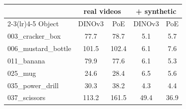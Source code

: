 \begin{tabular}{@{}l cc cc@{}}
\toprule
 & \multicolumn{2}{c}{real videos} & \multicolumn{2}{c}{+ synthetic} \\
\cmidrule(lr){2-3}\cmidrule(lr){4-5} Object & DINOv3 & PoE & DINOv3 & PoE \\
\midrule
003\_cracker\_box & 77.7 & 78.7 & 5.1 & 5.7 \\
006\_mustard\_bottle & 101.5 & 102.4 & 6.1 & 7.6 \\
011\_banana & 79.9 & 77.6 & 6.1 & 5.3 \\
025\_mug & 24.6 & 28.4 & 6.5 & 5.6 \\
035\_power\_drill & 30.3 & 38.2 & 4.3 & 4.4 \\
037\_scissors & 113.2 & 161.5 & 49.4 & 36.9 \\
\bottomrule
\end{tabular}